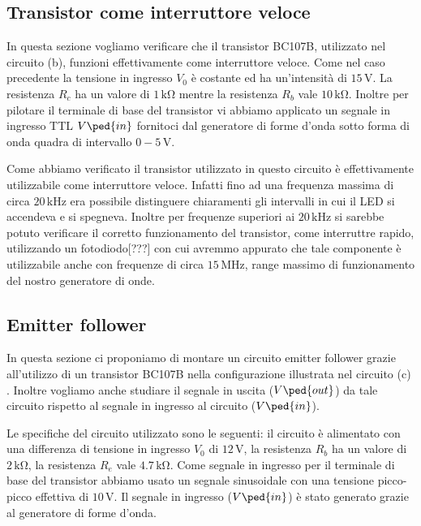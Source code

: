 \subsection*{Transistor come interruttore veloce}

In questa sezione vogliamo verificare che il transistor BC107B, utilizzato nel circuito (b), funzioni effettivamente come interruttore veloce.
Come nel caso precedente la tensione in ingresso $V_0$ è costante ed ha un'intensità di $15\,\si{\volt}$. La resistenza $R_c$ ha un valore di $1\,\si{\kilo\ohm}$ mentre la resistenza $R_b$ vale $10\,\si{\kilo\ohm}$. Inoltre per pilotare il terminale di base del transistor vi abbiamo applicato un segnale in ingresso TTL $V\ped{in}$ fornitoci dal generatore di forme d'onda sotto forma di onda quadra di intervallo $0-5\,\si{\volt}$.

Come abbiamo verificato il transistor utilizzato in questo circuito è effettivamente utilizzabile come interruttore veloce. Infatti fino ad una frequenza massima di circa $20\,\si{\kilo\hertz}$ era possibile distinguere chiaramenti gli intervalli in cui il LED si accendeva e si spegneva. Inoltre per frequenze superiori ai $20\,\si{\kilo\hertz}$  si sarebbe potuto verificare il corretto funzionamento del transistor, come interruttre rapido, utilizzando un fotodiodo[???] con cui avremmo appurato che tale componente è utilizzabile anche con frequenze di circa $15\,\si{\mega\hertz}$, range massimo di funzionamento del nostro generatore di onde.

\subsection*{Emitter follower}

In questa sezione ci proponiamo di montare un circuito emitter follower grazie all'utilizzo di un transistor BC107B nella configurazione illustrata nel circuito (c) . Inoltre vogliamo anche studiare il segnale in uscita ($V\ped{out}$) da tale circuito rispetto al segnale in ingresso al circuito ($V\ped{in}$).

Le specifiche del circuito utilizzato sono le seguenti: il circuito è alimentato con una differenza di tensione in ingresso $V_0$ di $12\,\si{\volt}$, la resistenza $R_b$ ha un valore di $2\,\si{\kilo\ohm}$, la resistenza $R_e$ vale $4.7\,\si{\kilo\ohm}$. Come segnale in ingresso per il terminale di base del transistor abbiamo usato un segnale sinusoidale con una tensione picco-picco effettiva di $10\,\si{\volt}$. Il segnale in ingresso ($V\ped{in}$) è stato generato grazie al generatore di forme d'onda.


